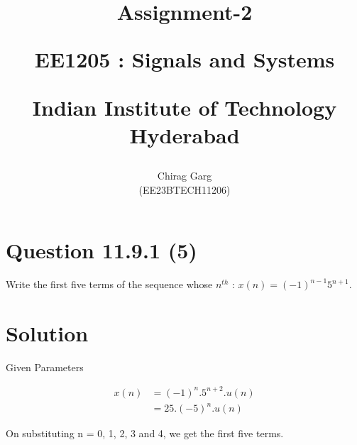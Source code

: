 \documentclass[journal,12pt,twocolumn]{IEEEtran}
\theoremstyle{remark}
\begin{document}
%




\vspace{3cm}

\title{
Assignment-2

\large{EE1205 : Signals and Systems}

Indian Institute of Technology Hyderabad
}
\author{Chirag Garg

(EE23BTECH11206)
}	





\maketitle

\newpage



\bigskip

\renewcommand{\thefigure}{\arabic{figure}}
\renewcommand{\thetable}{\arabic{table}}


\section{Question 11.9.1 (5)}
\vspace{0.5cm}
\begin{flushleft}
 Write the first five terms of the sequence whose $n^{th}$  : $x(n) = (-1)^{n-1}5^{n+1}$.
\end{flushleft} 


\vspace{0.8cm}


\section{Solution} 



\begin{table}[htbp]
\centering
\resizebox{\columnwidth}{!}{
}
\caption{ Given Parameters}

\end{table}

\begin{align}
	     x(n) &= (-1)^{n}.5^{n+2}.u(n) \\
	     &=25.(-5)^{n}.u(n)
 \end{align}
 
On substituting n = 0, 1, 2, 3 and 4, we get the first five terms.
\end{document}
